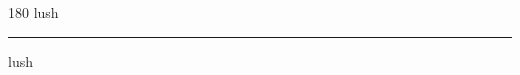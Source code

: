 
\begin{frame}
\begin{center}
\begin{turn}{180}
{\fontsize{2.5cm}{1em}\selectfont lush}
\end{turn}
\vspace{1em}\par  
\hrule
\vspace{1em}\par  
{\fontsize{2.5cm}{1em}\selectfont lush}
\end{center}
\end{frame}
